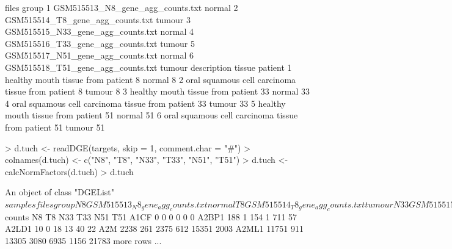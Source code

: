 \begin{Schunk}
\begin{Soutput}
                              files  group
1  GSM515513_N8_gene_agg_counts.txt normal
2  GSM515514_T8_gene_agg_counts.txt tumour
3 GSM515515_N33_gene_agg_counts.txt normal
4 GSM515516_T33_gene_agg_counts.txt tumour
5 GSM515517_N51_gene_agg_counts.txt normal
6 GSM515518_T51_gene_agg_counts.txt tumour
                                          description tissue patient
1                 healthy mouth tissue from patient 8 normal       8
2  oral squamous cell carcinoma tissue from patient 8 tumour       8
3                healthy mouth tissue from patient 33 normal      33
4 oral squamous cell carcinoma tissue from patient 33 tumour      33
5                healthy mouth tissue from patient 51 normal      51
6 oral squamous cell carcinoma tissue from patient 51 tumour      51
\end{Soutput}
\begin{Sinput}
> d.tuch <- readDGE(targets, skip = 1, comment.char = "#")
> colnames(d.tuch) <- c("N8", "T8", "N33", "T33", "N51", "T51")
> d.tuch <- calcNormFactors(d.tuch)
> d.tuch
\end{Sinput}
\begin{Soutput}
An object of class "DGEList"
$samples
                                files  group
N8   GSM515513_N8_gene_agg_counts.txt normal
T8   GSM515514_T8_gene_agg_counts.txt tumour
N33 GSM515515_N33_gene_agg_counts.txt normal
T33 GSM515516_T33_gene_agg_counts.txt tumour
N51 GSM515517_N51_gene_agg_counts.txt normal
T51 GSM515518_T51_gene_agg_counts.txt tumour
                                            description tissue patient lib.size
N8                  healthy mouth tissue from patient 8 normal       8  8859892
T8   oral squamous cell carcinoma tissue from patient 8 tumour       8  8270556
N33                healthy mouth tissue from patient 33 normal      33 17635449
T33 oral squamous cell carcinoma tissue from patient 33 tumour      33 15741712
N51                healthy mouth tissue from patient 51 normal      51 24009496
T51 oral squamous cell carcinoma tissue from patient 51 tumour      51 16967249
    norm.factors
N8     1.1510827
T8     1.0695499
N33    0.7049137
T33    0.9524320
N51    1.0427154
T51    1.1602638

$counts
         N8  T8   N33  T33   N51  T51
A1CF      0   0     0    0     0    0
A2BP1   188   1   154    1   711   57
A2LD1    10   0    18   13    40   22
A2M    2238 261  2375  612 15351 2003
A2ML1 11751 911 13305 3080  6935 1156
21783 more rows ...
\end{Soutput}
\end{Schunk}


